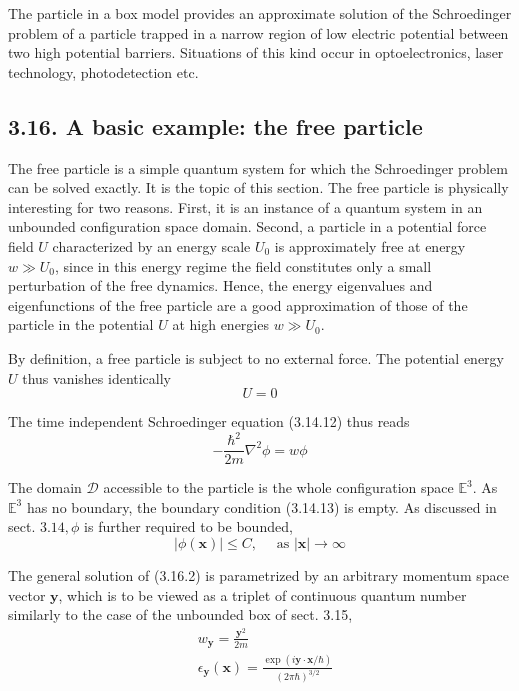\documentclass{article}
\begin{document}
The particle in a box model provides an approximate solution of the Schroedinger problem of a particle trapped in a narrow region of low electric potential between two high potential barriers. Situations of this kind occur in optoelectronics, laser technology, photodetection etc.

\subsection*{3.16. A basic example: the free particle}

The free particle is a simple quantum system for which the Schroedinger problem can be solved exactly. It is the topic of this section. The free particle is physically interesting for two reasons. First, it is an instance of a quantum system in an unbounded configuration space domain. Second, a particle in a potential force field $U$ characterized by an energy scale $U_{0}$ is approximately free at energy $w \gg U_{0}$, since in this energy regime the field constitutes only a small perturbation of the free dynamics. Hence, the energy eigenvalues and eigenfunctions of the free particle are a good approximation of those of the particle in the potential $U$ at high energies $w \gg U_{0}$.

By definition, a free particle is subject to no external force. The potential energy $U$ thus vanishes identically
$$
\begin{equation*}
U=0 \tag{3.16.1}
\end{equation*}
$$

The time independent Schroedinger equation (3.14.12) thus reads
$$
\begin{equation*}
-\frac{\hbar^{2}}{2 m} \nabla^{2} \phi=w \phi \tag{3.16.2}
\end{equation*}
$$

The domain $\mathcal{D}$ accessible to the particle is the whole configuration space $\mathbb{E}^{3}$. As $\mathbb{E}^{3}$ has no boundary, the boundary condition (3.14.13) is empty. As discussed in sect. $3.14, \phi$ is further required to be bounded,
$$
\begin{equation*}
|\phi(\boldsymbol{x})| \leq C, \quad \text { as }|\boldsymbol{x}| \rightarrow \infty \tag{3.16.3}
\end{equation*}
$$

The general solution of (3.16.2) is parametrized by an arbitrary momentum space vector $\boldsymbol{y}$, which is to be viewed as a triplet of continuous quantum number similarly to the case of the unbounded box of sect. 3.15,
$$
\begin{align*}
& w_{\boldsymbol{y}}=\frac{\boldsymbol{y}^{2}}{2 m}  \tag{3.16.4}\\
& \epsilon_{\boldsymbol{y}}(\boldsymbol{x})=\frac{\exp (i \boldsymbol{y} \cdot \boldsymbol{x} / \hbar)}{(2 \pi \hbar)^{3 / 2}} \tag{3.16.5}
\end{align*}
$$
\end{document}
